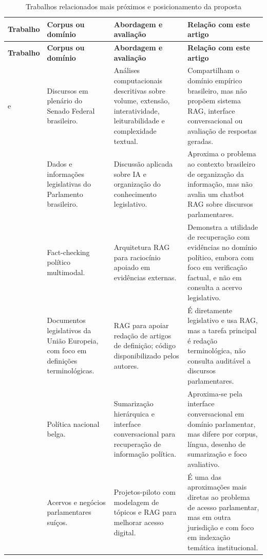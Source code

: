 \begin{scriptsize}
\begin{longtable}{@{}p{}p{}p{}p{}@{}}
\caption{Trabalhos relacionados mais próximos e posicionamento da proposta}
\label{tab:trabalhos-relacionados}\\
\hline
\textbf{Trabalho} & \textbf{Corpus ou domínio} & \textbf{Abordagem e avaliação} & \textbf{Relação com este artigo} \\
\hline
\endfirsthead
\hline
\textbf{Trabalho} & \textbf{Corpus ou domínio} & \textbf{Abordagem e avaliação} & \textbf{Relação com este artigo} \\
\hline
\endhead
\textcite{blanco2025plenarioPalanqueEstudio} e \textcite{blanco2026letrasGraudas} & Discursos em plenário do Senado Federal brasileiro. & Análises computacionais descritivas sobre volume, extensão, interatividade, leiturabilidade e complexidade textual. & Compartilham o domínio empírico brasileiro, mas não propõem sistema RAG, interface conversacional ou avaliação de respostas geradas. \\
\textcite{martelloteViola2025organizacaoConhecimento} & Dados e informações legislativas do Parlamento brasileiro. & Discussão aplicada sobre IA e organização do conhecimento legislativo. & Aproxima o problema ao contexto brasileiro de organização da informação, mas não avalia um chatbot RAG sobre discursos parlamentares. \\
\textcite{khaliq2024ragar} & Fact-checking político multimodal. & Arquitetura RAG para raciocínio apoiado em evidências externas. & Demonstra a utilidade de recuperação com evidências no domínio político, embora com foco em verificação factual, e não em consulta a acervo legislativo. \\
\textcite{chouhanGertz2024lexdrafter} & Documentos legislativos da União Europeia, com foco em definições terminológicas. & RAG para apoiar redação de artigos de definição; código disponibilizado pelos autores. & É diretamente legislativo e usa RAG, mas a tarefa principal é redação terminológica, não consulta auditável a discursos parlamentares. \\
\textcite{rogiersEtAl2024kamerraad} & Política nacional belga. & Sumarização hierárquica e interface conversacional para recuperação de informação política. & Aproxima-se pela interface conversacional em domínio parlamentar, mas difere por corpus, língua, desenho de sumarização e foco avaliativo. \\
\textcite{matoshiEtAl2025parliamentRag} & Acervos e negócios parlamentares suíços. & Projetos-piloto com modelagem de tópicos e RAG para melhorar acesso digital. & É uma das aproximações mais diretas ao problema de acesso parlamentar, mas em outra jurisdição e com foco em indexação temática institucional. \\

\end{longtable}
\end{scriptsize}
